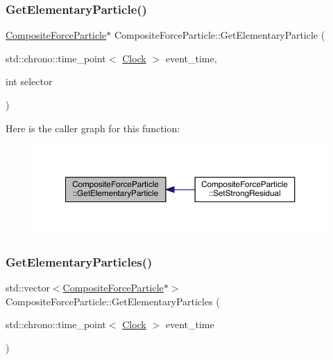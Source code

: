 \subsubsection{\texorpdfstring{Get\+Elementary\+Particle()}{GetElementaryParticle()}}
{\footnotesize\ttfamily \hyperlink{class_composite_force_particle}{Composite\+Force\+Particle}$\ast$ Composite\+Force\+Particle\+::\+Get\+Elementary\+Particle (\begin{DoxyParamCaption}\item[{std\+::chrono\+::time\+\_\+point$<$ \hyperlink{universe_8h_a0ef8d951d1ca5ab3cfaf7ab4c7a6fd80}{Clock} $>$}]{event\+\_\+time,  }\item[{int}]{selector }\end{DoxyParamCaption})}

Here is the caller graph for this function\+:\nopagebreak
\begin{figure}[H]
\begin{center}
\leavevmode
\includegraphics[width=350pt]{class_composite_force_particle_a750da9f3cd367287b051b820857c80d0_icgraph}
\end{center}
\end{figure}
\mbox{\label{class_composite_force_particle_ab953693d61515b96fe78b0cf1da058c6}} 
\subsubsection{\texorpdfstring{Get\+Elementary\+Particles()}{GetElementaryParticles()}}
{\footnotesize\ttfamily std\+::vector$<$\hyperlink{class_composite_force_particle}{Composite\+Force\+Particle}$\ast$$>$ Composite\+Force\+Particle\+::\+Get\+Elementary\+Particles (\begin{DoxyParamCaption}\item[{std\+::chrono\+::time\+\_\+point$<$ \hyperlink{universe_8h_a0ef8d951d1ca5ab3cfaf7ab4c7a6fd80}{Clock} $>$}]{event\+\_\+time }\end{DoxyParamCaption})}

